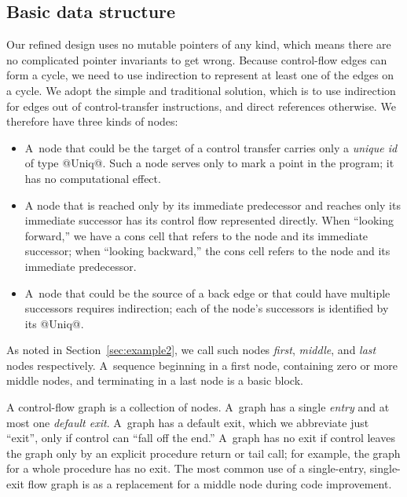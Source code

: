 \documentclass[blockstyle,preprint,nocopyrightspace]{sigplanconf}
\newcommand\secref[1]{Section~\ref{sec:#1}}
\begin{document}
\subsection{Basic data structure}

Our refined design uses no mutable pointers of any kind, which means
there are no complicated pointer invariants to get wrong.
Because control-flow edges can form a cycle, we need to use 
indirection to represent at least one of the edges on a cycle.
We adopt the simple and traditional solution, which is to use
indirection for edges out of control-transfer instructions, and direct
references otherwise.
We therefore have three kinds of nodes:
\begin{itemize}
\item
A~node that could be the target of a control transfer carries only
a \emph{unique id} of type @Uniq@.
Such a node serves only to mark a point in the
program; it has no computational effect.
\item
A node that is reached only by its immediate predecessor and reaches
only its immediate successor has its control flow represented
directly. 
When ``looking forward,'' we have a cons cell that refers to the node
and its immediate successor;
when ``looking backward,'' the cons cell refers to the node
and its immediate predecessor.
\item
A~node that could be the source of a back edge or that could
have multiple successors requires indirection;
each of the node's
successors is identified by its @Uniq@.
\end{itemize}
As noted in \secref{example2},
we call such nodes \emph{first}, \emph{middle}, and \emph{last} nodes
respectively.
A~sequence beginning in a first node, containing zero or more middle
nodes, and terminating in a last node is a basic block.

A control-flow graph is a collection of nodes.
A~graph has a single \emph{entry} and at most one \emph{default exit}.
A~graph has a default exit, which we abbreviate just ``exit'', only if
control can ``fall off the end.'' 
A~graph has no exit if control leaves the graph only by an explicit
procedure return or tail call;
for example, the graph for a whole procedure  has no exit.
The most common use of a single-entry, single-exit flow graph is as a
replacement for a middle node during code improvement.
\end{document}

